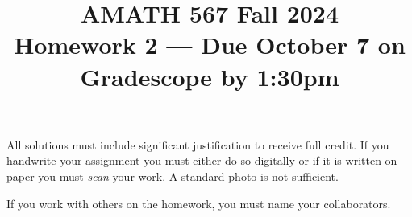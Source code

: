 \documentclass[10pt]{amsart}
\theoremstyle{nonumberplain}
\begin{document}
\pagestyle{empty}

\newcommand{\mline}{\vspace{.2in}\hrule\vspace{.2in}}


\title{\bf { AMATH 567 Fall 2024 \\ Homework 2 ---
    Due October 7 on Gradescope by 1:30pm} }


\maketitle

\begin{center}
  All solutions must include significant justification to receive full credit.  If you handwrite your assignment you must either do so digitally or if it is written on paper you must \emph{scan} your work.  A standard photo is not sufficient.  \vskip 4pt

  If you work with others on the homework, you must name your collaborators.
\end{center}
\end{document}

